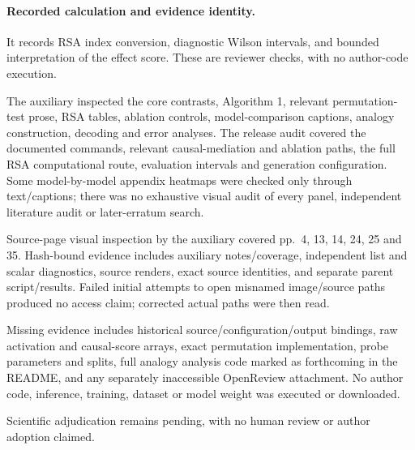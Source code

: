 \documentclass[10pt]{article}
\begin{document}
\paragraph*{Recorded calculation and evidence identity.}\mbox{}\par
It records RSA index conversion, diagnostic Wilson intervals, and bounded interpretation of the effect score. These are reviewer checks, with no author-code execution.\par
The auxiliary inspected the core contrasts, Algorithm 1, relevant permutation-test prose, RSA tables, ablation controls, model-comparison captions, analogy construction, decoding and error analyses. The release audit covered the documented commands, relevant causal-mediation and ablation paths, the full RSA computational route, evaluation intervals and generation configuration. Some model-by-model appendix heatmaps were checked only through text/captions; there was no exhaustive visual audit of every panel, independent literature audit or later-erratum search.\par
Source-page visual inspection by the auxiliary covered pp. 4, 13, 14, 24, 25 and 35. Hash-bound evidence includes auxiliary notes/coverage, independent list and scalar diagnostics, source renders, exact source identities, and separate parent script/results. Failed initial attempts to open misnamed image/source paths produced no access claim; corrected actual paths were then read.\par
Missing evidence includes historical source/configuration/output bindings, raw activation and causal-score arrays, exact permutation implementation, probe parameters and splits, full analogy analysis code marked as forthcoming in the README, and any separately inaccessible OpenReview attachment. No author code, inference, training, dataset or model weight was executed or downloaded.\par
Scientific adjudication remains pending, with no human review or author adoption claimed.\par
\end{document}
